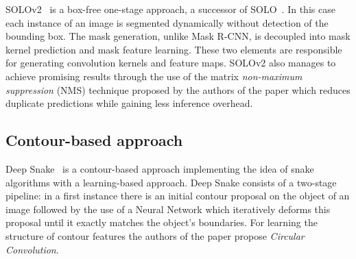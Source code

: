 \documentclass[10pt,twocolumn,letterpaper]{article}
\begin{document}
\noindent
\indent SOLOv2~\cite{Authors6_SOLOv2} is a box-free one-stage approach, a successor of SOLO~\cite{solo}.
In this case each instance of an image is segmented dynamically without detection of the bounding box.
The mask generation, unlike Mask R-CNN, is decoupled into mask kernel prediction and mask feature learning. These two elements are responsible for generating convolution kernels and feature maps. SOLOv2 also manages to achieve promising results through the use of the matrix \textit{non-maximum suppression} (NMS) technique proposed by the authors of the paper which reduces duplicate predictions while gaining less inference overhead.
\subsection{Contour-based approach}
Deep Snake~\cite{Authors7_deepsnake} is a contour-based approach implementing the idea of snake algorithms with a learning-based approach. Deep Snake consists of a two-stage pipeline: in a first instance there is an initial contour proposal on the object of an image followed by the use of a Neural Network which iteratively deforms this proposal until it exactly matches the object's boundaries. For learning the structure of contour features the authors of the paper propose \textit{Circular Convolution}.
\end{document}
